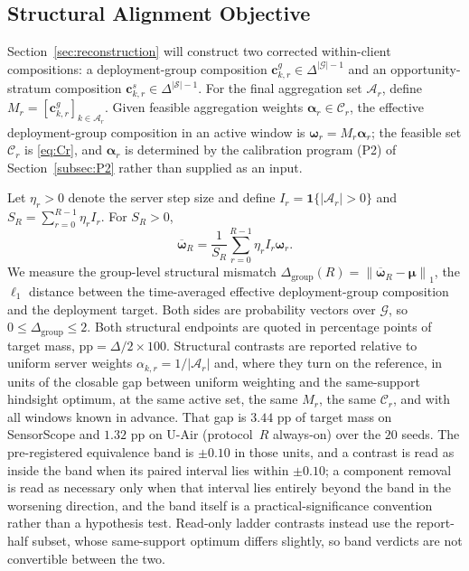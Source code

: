 \documentclass[letterpaper,journal]{IEEEtran}
\begin{document}
\subsection{Structural Alignment Objective}
\label{subsec:design_objective}
\label{subsec:equivalence_band}

Section~\ref{sec:reconstruction} will construct two corrected within-client
compositions: a deployment-group composition
$\mathbf{c}^{g}_{k,r}\in\Delta^{|\mathcal{G}|-1}$ and an opportunity-stratum
composition $\mathbf{c}^{s}_{k,r}\in\Delta^{|\mathcal{S}|-1}$.  For the final
aggregation set $\mathcal{A}_r$, define
$M_r=[\mathbf{c}^{g}_{k,r}]_{k\in\mathcal{A}_r}$.  Given feasible aggregation
weights $\boldsymbol\alpha_r\in\mathcal{C}_r$, the effective deployment-group
composition in an active window is $\boldsymbol\omega_r=M_r\boldsymbol\alpha_r$;
the feasible set $\mathcal{C}_r$ is \eqref{eq:Cr}, and $\boldsymbol\alpha_r$ is
determined by the calibration program (P2) of Section~\ref{subsec:P2} rather than
supplied as an input.

Let $\eta_r>0$ denote the server step size and define
$I_r=\mathbf{1}\{|\mathcal{A}_r|>0\}$ and
$S_R=\sum_{r=0}^{R-1}\eta_r I_r$.
For $S_R>0$,
\begin{equation}
    \overline{\boldsymbol\omega}_R
    =
    \frac{1}{S_R}
    \sum_{r=0}^{R-1}
    \eta_r I_r\boldsymbol\omega_r.
    \label{eq:omega_bar}
\end{equation}
We measure the group-level structural mismatch
$\Delta_{\mathrm{group}}(R)=\left\|
\overline{\boldsymbol\omega}_R-\boldsymbol\mu
\right\|_1$,
the $\ell_1$ distance between the time-averaged effective deployment-group
composition and the deployment target.  Both sides are probability vectors
over $\mathcal{G}$, so $0\le\Delta_{\mathrm{group}}\le2$.  Both structural
endpoints are quoted in percentage points of target mass,
$\mathrm{pp}=\Delta/2\times100$.  Structural contrasts are reported relative to
uniform server weights $\alpha_{k,r}=1/|\mathcal{A}_r|$ and, where they turn on
the reference, in units of the closable gap between uniform weighting and the
same-support hindsight optimum, at the same active set, the same $M_r$, the same
$\mathcal{C}_r$, and with all windows known in advance.  That gap is $3.44$ pp of
target mass on SensorScope and $1.32$ pp on U-Air (protocol~$R$ always-on) over
the $20$ seeds.  The pre-registered equivalence band is $\pm0.10$ in those
units, and a contrast is read as inside the band when its paired interval lies
within $\pm0.10$; a component removal is read as necessary only when that
interval lies entirely beyond the band in the worsening direction, and the band
itself is a practical-significance convention rather than a hypothesis test.
Read-only ladder contrasts instead use the report-half subset, whose
same-support optimum differs slightly, so band verdicts are not convertible
between the two.
\end{document}
